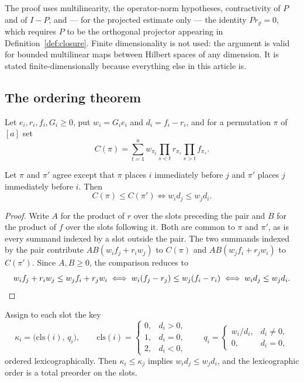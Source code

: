 \begin{remark}
\label{rem:whatisused}
The proof uses multilinearity, the operator-norm hypotheses, contractivity of $P$ and of
$I-P$, and --- for the projected estimate only --- the identity $Pr_\varrho=0$, which
requires $P$ to be the orthogonal projector appearing in Definition~\ref{def:closure}.
Finite dimensionality is not used: the argument is valid for bounded multilinear maps
between Hilbert spaces of any dimension. It is stated finite-dimensionally because
everything else in this article is.
\end{remark}

\subsection{The ordering theorem}

Let $e_i,r_i,f_i,G_i\ge0$, put $w_i=G_ie_i$ and $d_i=f_i-r_i$, and for a permutation
$\pi$ of $[a]$ set
\[
 C(\pi)=\sum_{t=1}^{a}w_{\pi_t}\prod_{s<t}r_{\pi_s}\prod_{s>t}f_{\pi_s}.
\]

\begin{lemma}
\label{lem:exchange}
Let $\pi$ and $\pi'$ agree except that $\pi$ places $i$ immediately before $j$ and $\pi'$
places $j$ immediately before $i$. Then
\[
 C(\pi)\le C(\pi')
 \iff
 w_id_j\le w_jd_i.
\]
\end{lemma}

\begin{proof}
Write $A$ for the product of $r$ over the slots preceding the pair and $B$ for the
product of $f$ over the slots following it. Both are common to $\pi$ and $\pi'$, as is
every summand indexed by a slot outside the pair. The two summands indexed by the pair
contribute $AB(w_if_j+r_iw_j)$ to $C(\pi)$ and $AB(w_jf_i+r_jw_i)$ to $C(\pi')$. Since
$A,B\ge0$, the comparison reduces to
\[
 w_if_j+r_iw_j\le w_jf_i+r_jw_i
 \iff
 w_i(f_j-r_j)\le w_j(f_i-r_i)
 \iff
 w_id_j\le w_jd_i.\qedhere
\]
\end{proof}

\begin{lemma}
\label{lem:preorder}
Assign to each slot the key
\[
 \kappa_i=\bigl(\mathrm{cls}(i),\,q_i\bigr),
 \qquad
 \mathrm{cls}(i)=
 \begin{cases}
 0,&d_i>0,\\
 1,&d_i=0,\\
 2,&d_i<0,
 \end{cases}
 \qquad
 q_i=
 \begin{cases}
 w_i/d_i,&d_i\ne0,\\
 0,&d_i=0,
 \end{cases}
\]
ordered lexicographically. Then $\kappa_i\le\kappa_j$ implies $w_id_j\le w_jd_i$, and the
lexicographic order is a total preorder on the slots.
\end{lemma}

